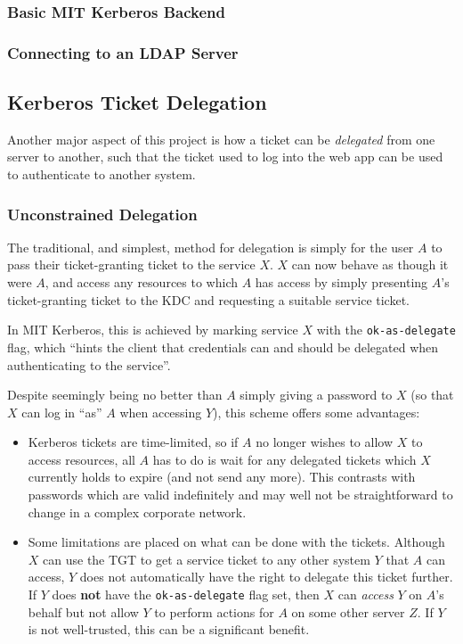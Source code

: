 \documentclass{article}
\begin{document}
\subsubsection{Basic MIT Kerberos Backend}


\subsubsection{Connecting to an LDAP Server}

\subsection{Kerberos Ticket Delegation}
Another major aspect of this project is how a ticket can be \textit{delegated} from one server to another, such that the ticket used to log into the web app can be used to authenticate to another system.

\subsubsection{Unconstrained Delegation}
The traditional, and simplest, method for delegation is simply for the user $A$ to pass their ticket-granting ticket to the service $X$. $X$ can now behave as though it were $A$, and access any resources to which $A$ has access by simply presenting $A$'s ticket-granting ticket to the KDC and requesting a suitable service ticket.

In MIT Kerberos, this is achieved by marking service $X$ with the \verb+ok-as-delegate+ flag, which ``hints the client that credentials can and should be delegated when authenticating to the service''\cite{KDC-conf-docs}.

Despite seemingly being no better than $A$ simply giving a password to $X$ (so that $X$ can log in ``as'' $A$ when accessing $Y$), this scheme offers some advantages:

\begin{itemize}
\item
  Kerberos tickets are time-limited, so if $A$ no longer wishes to allow $X$ to access resources, all $A$ has to do is wait for any delegated tickets which $X$ currently holds to expire (and not send any more). This contrasts with passwords which are valid indefinitely and may well not be straightforward to change in a complex corporate network.
\item
  Some limitations are placed on what can be done with the tickets. Although $X$ can use the TGT to get a service ticket to any other system $Y$ that $A$ can access, $Y$ does not automatically have the right to delegate this ticket further. If $Y$ does \textbf{not} have the \verb+ok-as-delegate+ flag set, then $X$ can \textit{access} $Y$ on $A$'s behalf but not allow $Y$ to perform actions for $A$ on some other server $Z$. If $Y$ is not well-trusted, this can be a significant benefit.
\end{itemize}
\end{document}
